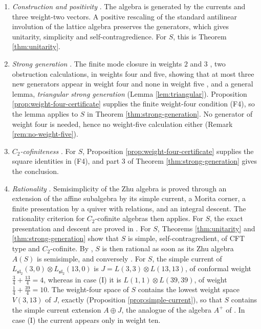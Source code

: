 \documentclass[leqno]{article}
\newcommand{\ot}{\otimes}
\numberwithin{equation}{section}
\begin{document}
\begin{enumerate}
\item \emph{Construction and positivity} \cite[Sections 2--3, pp.~16--19]{Rie26b}. The algebra is generated by the currents and three weight-two vectors. A positive rescaling of the standard antilinear involution of the lattice algebra preserves the generators, which gives unitarity, simplicity and self-contragredience. For $S$, this is Theorem \ref{thm:unitarity}.

\item \emph{Strong generation} \cite[Section 4, pp.~20--24]{Rie26b}. The finite mode closure in weights $2$ and $3$ \cite[Proposition 4.1]{Rie26b}, two obstruction calculations, in weights four and five, showing that at most three new generators appear in weight four and none in weight five \cite[Proposition 4.2]{Rie26b}, and a general lemma, \emph{triangular strong generation} \cite[Lemma 4.3]{Rie26b} (Lemma \ref{lem:triangular}). Proposition \ref{prop:weight-four-certificate} supplies the finite weight-four condition \textup{(F4)}, so the lemma applies to $S$ in Theorem \ref{thm:strong-generation}. No generator of weight four is needed, hence no weight-five calculation either (Remark \ref{rem:no-weight-five}).

\item \emph{$C_2$-cofiniteness} \cite[Section 5, pp.~24--25]{Rie26b}. For $S$, Proposition \ref{prop:weight-four-certificate} supplies the square identities in \textup{(F4)}, and part 3 of Theorem \ref{thm:strong-generation} gives the conclusion.

\item \emph{Rationality} \cite[Part III, pp.~25--55]{Rie26b}. Semisimplicity of the Zhu algebra is proved through an extension of the affine subalgebra by its simple current, a Morita corner, a finite presentation by a quiver with relations, and an integral descent. The rationality criterion for $C_2$-cofinite algebras then applies. For $S$, the exact presentation and descent are proved in \cite[Theorems A.10 and A.13]{ArhIII}. For $S$, Theorems \ref{thm:unitarity} and \ref{thm:strong-generation} show that $S$ is simple, self-contragredient, of CFT type and $C_2$-cofinite. By \cite[Main Theorem 3 (Corollary 5.19)]{McR21}, $S$ is then rational as soon as its Zhu algebra $A(S)$ is semisimple, and conversely \cite{Zhu96}. For $S$, the simple current of $L_{\mathfrak{sl}_2}(3,0) \ot L_{\mathfrak{sl}_2}(13,0)$ is $J = L(3,3) \ot L(13,13)$, of conformal weight $\frac{3}{4} + \frac{13}{4} = 4$, whereas in case (I) it is $L(1,1) \ot L(39,39)$, of weight $\frac14 + \frac{39}{4} = 10$. The weight-four space of $S$ contains the lowest weight space $V(3,13)$ of $J$, exactly (Proposition \ref{prop:simple-current}), so that $S$ contains the simple current extension $A \oplus J$, the analogue of the algebra $A^+$ of \cite[Section 7]{Rie26b}. In case (I) the current appears only in weight ten.


\end{enumerate}
\end{document}
